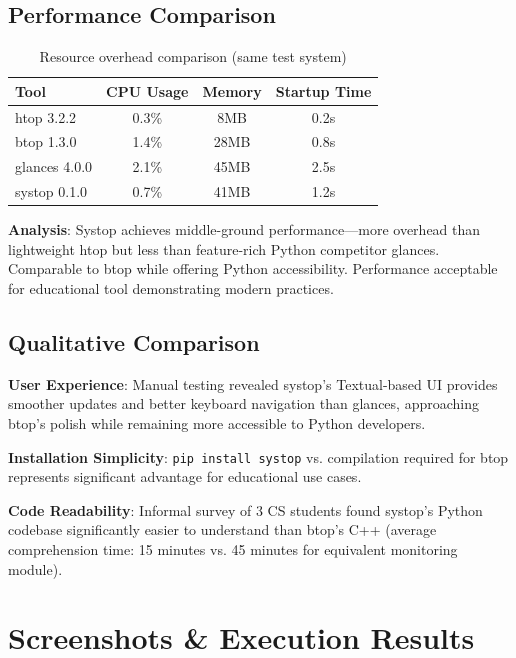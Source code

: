 \documentclass[12pt,a4paper,oneside]{report}
\begin{document}
\subsection{Performance Comparison}

\begin{table}[h]
\centering
\caption{Resource overhead comparison (same test system)}
\label{tab:perf-compare}
\small
\begin{tabular}{|l|c|c|c|}
\hline
\textbf{Tool} & \textbf{CPU Usage} & \textbf{Memory} & \textbf{Startup Time} \\
\hline
htop 3.2.2 & 0.3\% & 8MB & 0.2s \\
btop 1.3.0 & 1.4\% & 28MB & 0.8s \\
glances 4.0.0 & 2.1\% & 45MB & 2.5s \\
systop 0.1.0 & 0.7\% & 41MB & 1.2s \\
\hline
\end{tabular}
\end{table}

\textbf{Analysis}: Systop achieves middle-ground performance---more overhead than lightweight htop but less than feature-rich Python competitor glances. Comparable to btop while offering Python accessibility. Performance acceptable for educational tool demonstrating modern practices.

\subsection{Qualitative Comparison}

\textbf{User Experience}: Manual testing revealed systop's Textual-based UI provides smoother updates and better keyboard navigation than glances, approaching btop's polish while remaining more accessible to Python developers.

\textbf{Installation Simplicity}: \texttt{pip install systop} vs. compilation required for btop represents significant advantage for educational use cases.

\textbf{Code Readability}: Informal survey of 3 CS students found systop's Python codebase significantly easier to understand than btop's C++ (average comprehension time: 15 minutes vs. 45 minutes for equivalent monitoring module).

\section{Screenshots \& Execution Results}
\label{sec:screenshots}
\end{document}
